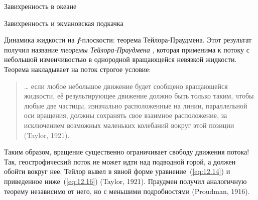 \begin{chapter}{Завихренность в океане}
\begin{section}{Завихренность и экмановская подкачка}
\begin{paragraph}{Динамика жидкости на \textbf{\textit{f}}-плоскости: 
теорема Тейлора-Праудмена.}
Этот результат получил название \emph{теоремы Тейлора-Праудмена}%
, которая применима к потоку с 
небольшой изменчивостью в однородной вращающейся невязкой жидкости. 
Теорема накладывает на поток строгое условие:
\begin{quotation}
\dots{} если любое небольшое движение будет сообщено вращающейся
жидкости, её результирующее движение должно быть только таким,
чтобы любые две частицы, изначально расположенные на линии,
параллельной оси вращения, должны сохранять свое взаимное
расположение, за исключением возможных маленьких колебаний вокруг этой
позиции (Taylor, 1921).
\end{quotation}
Таким образом, вращение существенно ограничивает свободу движения потока!
Так, геострофический поток%
 не может идти над 
подводной горой, а должен обойти вокруг нее. Тейлор вывел в явной форме 
уравнение~(\ref{eq:12.14}) и приведенное ниже~(\ref{eq:12.16}) (Taylor, 1921). 
Праудмен получил аналогичную теорему независимо от него, но с меньшими
подробностями (Proudman, 1916).
%


\end{paragraph}
\end{section}
\end{chapter}
